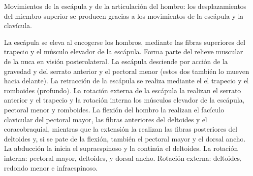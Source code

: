 Movimientos de la escápula y de la articulación del hombro: los desplazamientos del miembro superior se producen gracias a los movimientos de la escápula y la clavícula.

La escápula se eleva al encogerse los hombros, mediante las fibras superiores del trapecio y el músculo elevador de la escápula. Forma parte del relieve muscular de la nuca en visión posterolateral. La escápula desciende por acción de la gravedad y del serrato anterior y el pectoral menor (estos dos también lo mueven hacia delante). La retracción de la escápula se realiza mediante el el trapecio y el romboides (profundo). La rotación externa de la escápula la realizan el serrato anterior y el trapecio y la rotación interna los músculos elevador de la escápula, pectoral menor y romboides. La flexión del hombro la realizan el facículo clavicular del pectoral mayor, las fibras anteriores del deltoides y el coracobraquial, mientras que la extensión la realizan las fibras posteriores del deltoides y, si se pate de la flexión, también el pectoral mayor y el dorsal ancho. La abducción la inicia el supraespinoso y la continúa el deltoides. La rotación interna: pectoral mayor, deltoides, y dorsal ancho. Rotación externa: deltoides, redondo menor e infraespinoso.